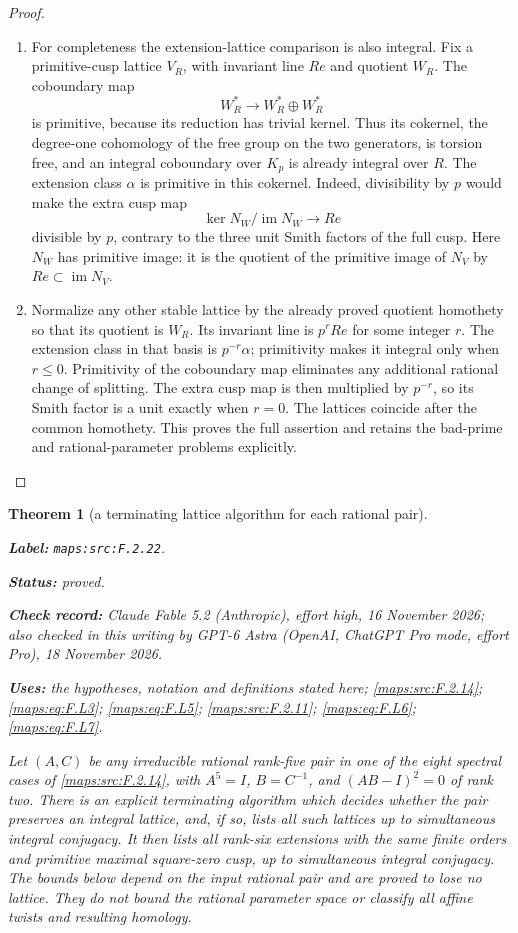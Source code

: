 \documentclass[11pt,a4paper]{article}
\newtheorem{theorem}{Theorem}[section]
\theoremstyle{definition}
\newcommand{\StatementRecord}[4]{\par\smallskip\begingroup\upshape\raggedright\noindent\textbf{Label:} \nolinkurl{#1}.\par\noindent\textbf{Status:} #2.\par\noindent\textbf{Check record:} #3.\par\noindent\textbf{Uses:} #4.\par\endgroup\smallskip}
\newcommand{\CurrentChecker}{GPT-6 Astra (OpenAI, ChatGPT Pro mode, effort Pro), 18 November 2026}
\begin{document}
\begin{proof}
\begin{enumerate}[label=\arabic*.]
\item For completeness the extension-lattice comparison is also
integral.  Fix a primitive-cusp lattice $V_R$, with invariant
line $Re$ and quotient $W_R$.
The coboundary map
\[
 W_R^*\longrightarrow W_R^*\oplus W_R^*
\]
is primitive, because its reduction has trivial kernel.
Thus its cokernel, the degree-one cohomology of the free
group on the two generators, is torsion free, and an
integral coboundary over $K_p$ is already integral over $R$.
The extension class $\alpha$ is primitive in this cokernel.
Indeed, divisibility by $p$ would make the extra cusp map
\[
 \ker N_W/\operatorname{im}N_W\longrightarrow Re
\]
divisible by $p$, contrary to the three unit Smith factors
of the full cusp.  Here $N_W$ has primitive image:
it is the quotient of the primitive image of $N_V$ by
$Re\subset\operatorname{im}N_V$.

\item Normalize any other stable lattice by the already proved
quotient homothety so that its quotient is $W_R$.
Its invariant line is $p^rRe$ for some integer $r$.
The extension class in that basis is $p^{-r}\alpha$;
primitivity makes it integral only when $r\leq0$.
Primitivity of the coboundary map eliminates any additional
rational change of splitting.  The extra cusp map is then
multiplied by $p^{-r}$, so its Smith factor is a unit exactly
when $r=0$.  The lattices coincide after the common homothety.
This proves the full assertion and retains the bad-prime
and rational-parameter problems explicitly.

\end{enumerate}
\end{proof}




\begin{theorem}[a terminating lattice algorithm for each rational pair]\label{maps:src:F.2.22}
\StatementRecord{maps:src:F.2.22}{proved}{Claude Fable 5.2 (Anthropic), effort high, 16 November 2026; also checked in this writing by \CurrentChecker}{the hypotheses, notation and definitions stated here; \cref{maps:src:F.2.14}; \cref{maps:eq:F.L3}; \cref{maps:eq:F.L5}; \cref{maps:src:F.2.11}; \cref{maps:eq:F.L6}; \cref{maps:eq:F.L7}}


Let $(A,C)$ be any irreducible rational rank-five pair in
one of the eight spectral cases of \ref{maps:src:F.2.14}, with
$A^5=I$, $B=C^{-1}$, and $(AB-I)^2=0$ of rank two.
There is an explicit terminating algorithm which decides
whether the pair preserves an integral lattice, and, if so,
lists all such lattices up to simultaneous integral conjugacy.
It then lists all rank-six extensions with the same finite
orders and primitive maximal square-zero cusp, up to
simultaneous integral conjugacy.  The bounds below depend
on the input rational pair and are proved to lose no lattice.
They do not bound the rational parameter space or classify
all affine twists and resulting homology.

\end{theorem}
\end{document}
